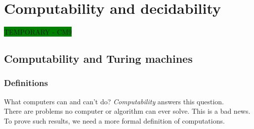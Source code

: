 \chapter{Computability and decidability}

\colorbox{green}{TEMPORARY - CM9}

\section{Computability and Turing machines}

\subsection{Definitions}
What computers can and can't do? \emph{Computability} answers this question.\\
There are problems no computer or algorithm can ever solve. This is a bad news.\\
To prove such results, we need a more formal definition of computations.


